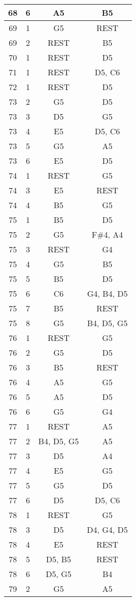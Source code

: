 \documentclass{article}
\begin{document}
\begin{longtable}{|c|c|c|c|}
68 & 6 & A5 & B5 \\ 
\hline
69 & 1 & G5 & REST \\ 
69 & 2 & REST & B5 \\ 
\hline
70 & 1 & REST & D5 \\ 
\hline
71 & 1 & REST & D5, C6 \\ 
\hline
72 & 1 & REST & D5 \\ 
\hline
73 & 2 & G5 & D5 \\ 
73 & 3 & D5 & G5 \\ 
73 & 4 & E5 & D5, C6 \\ 
73 & 5 & G5 & A5 \\ 
73 & 6 & E5 & D5 \\ 
\hline
74 & 1 & REST & G5 \\ 
74 & 3 & E5 & REST \\ 
74 & 4 & B5 & G5 \\ 
\hline
75 & 1 & B5 & D5 \\ 
75 & 2 & G5 & F\#4, A4 \\ 
75 & 3 & REST & G4 \\ 
75 & 4 & G5 & B5 \\ 
75 & 5 & B5 & D5 \\ 
75 & 6 & C6 & G4, B4, D5 \\ 
75 & 7 & B5 & REST \\ 
75 & 8 & G5 & B4, D5, G5 \\ 
\hline
76 & 1 & REST & G5 \\ 
76 & 2 & G5 & D5 \\ 
76 & 3 & B5 & REST \\ 
76 & 4 & A5 & G5 \\ 
76 & 5 & A5 & D5 \\ 
76 & 6 & G5 & G4 \\ 
\hline
77 & 1 & REST & A5 \\ 
77 & 2 & B4, D5, G5 & A5 \\ 
77 & 3 & D5 & A4 \\ 
77 & 4 & E5 & G5 \\ 
77 & 5 & G5 & D5 \\ 
77 & 6 & D5 & D5, C6 \\ 
\hline
78 & 1 & REST & G5 \\ 
78 & 3 & D5 & D4, G4, D5 \\ 
78 & 4 & E5 & REST \\ 
78 & 5 & D5, B5 & REST \\ 
78 & 6 & D5, G5 & B4 \\ 
\hline
79 & 2 & G5 & A5 \\ 

\end{longtable}
\end{document}
